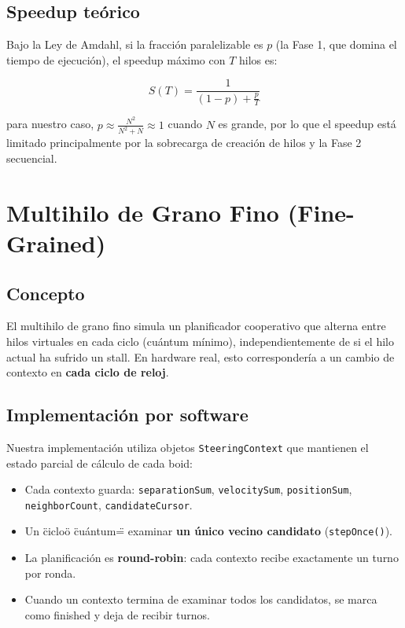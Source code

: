 \documentclass[11pt,a4paper]{article}
\begin{document}
\subsection{Speedup teórico}

Bajo la Ley de Amdahl, si la fracción paralelizable es $p$ (la Fase 1, que domina el tiempo de ejecución), el speedup máximo con $T$ hilos es:

\begin{equation}
  S(T) = \frac{1}{(1-p) + \frac{p}{T}}
  \label{eq:amdahl}
\end{equation}

\noindent para nuestro caso, $p \approx \frac{N^2}{N^2 + N} \approx 1$ cuando $N$ es grande, por lo que el speedup está limitado principalmente por la sobrecarga de creación de hilos y la Fase 2 secuencial.

\section{Multihilo de Grano Fino (Fine-Grained)}
\label{sec:grano-fino}

\subsection{Concepto}

El multihilo de grano fino simula un planificador cooperativo que alterna entre hilos virtuales en cada ciclo (cuántum mínimo), independientemente de si el hilo actual ha sufrido un stall. En hardware real, esto correspondería a un cambio de contexto en \textbf{cada ciclo de reloj}.

\subsection{Implementación por software}

Nuestra implementación utiliza objetos \texttt{SteeringContext} que mantienen el estado parcial de cálculo de cada boid:

\begin{itemize}
  \item Cada contexto guarda: \texttt{separationSum}, \texttt{velocitySum}, \texttt{positionSum}, \texttt{neighborCount}, \texttt{candidateCursor}.
  \item Un \"ciclo\" o \"cuántum\" = examinar \textbf{un único vecino candidato} (\texttt{stepOnce()}).
  \item La planificación es \textbf{round-robin}: cada contexto recibe exactamente un turno por ronda.
  \item Cuando un contexto termina de examinar todos los candidatos, se marca como finished y deja de recibir turnos.
\end{itemize}
\end{document}
